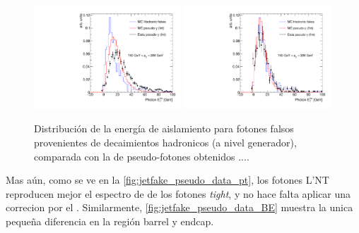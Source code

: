 \begin{figure}[!htbp]
  \centering

  \includegraphics[width=0.49\textwidth]{figures/bkg_mc_pseudo_data_SR_l_ptbin}
  \includegraphics[width=0.49\textwidth]{figures/bkg_mc_pseudo_data_SR_lp_ptbin}

  \caption{Distribución de la energía de aislamiento para fotones falsos
    provenientes de decaimientos hadronicos (a nivel generador), comparada con
    la de pseudo-fotones obtenidos ....}
  \label{fig:jetfake_mc_data}

\end{figure}

Mas aún, como se ve en la \cref{fig:jetfake_pseudo_data_pt}, los fotones L'NT
reproducen mejor el espectro de {\pt} de los fotones \emph{tight}, y no hace falta aplicar
una correcion por el {\pt}. Similarmente,
\cref{fig:jetfake_pseudo_data_BE} muestra la unica pequeña diferencia en la
región barrel y endcap.


